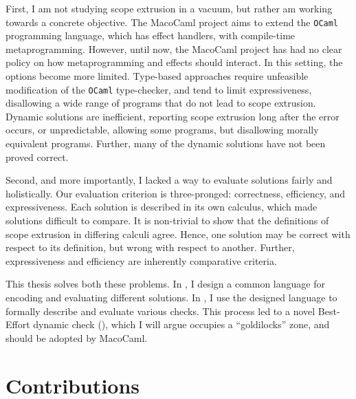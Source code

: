 First, I am not studying scope extrusion in a vacuum, but rather am working towards a concrete objective. The MacoCaml \citep{xie-2022} project aims to extend the \texttt{OCaml} programming language, which has effect handlers, with compile-time metaprogramming. However, until now, the MacoCaml project has had no clear policy on how metaprogramming and effects should interact. In this setting, the options become more limited. Type-based approaches require unfeasible modification of the \texttt{OCaml} type-checker, and tend to limit expressiveness, disallowing a wide range of programs that do not lead to scope extrusion. Dynamic solutions are inefficient, reporting scope extrusion long after the error occurs, or unpredictable, allowing some programs, but disallowing morally equivalent programs. Further, many of the dynamic solutions have not been proved correct.

Second, and more importantly, I lacked a way to evaluate solutions fairly and holistically. Our evaluation criterion is three-pronged: correctness, efficiency, and expressiveness. Each solution is described in its own calculus, which made solutions difficult to compare. It is non-trivial to show that the definitions of scope extrusion in differing calculi agree. Hence, one solution may be correct with respect to its definition, but wrong with respect to another. Further, expressiveness and efficiency are inherently comparative criteria.

This thesis solves both these problems. In , I design a common language for encoding and evaluating different solutions. In , I use the designed language to formally describe and evaluate various checks. This process led to a novel Best-Effort dynamic check (), which I will argue occupies a ``goldilocks'' zone, and should be adopted by MacoCaml.

\section{Contributions}

